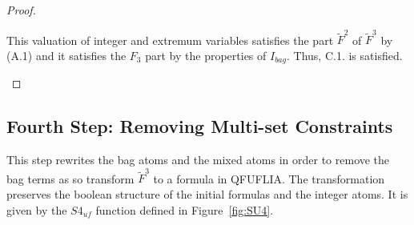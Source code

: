 \begin{proof}
\begin{enumerate}
This valuation of integer and extremum variables satisfies the part $\tilde{F}^2$ of $\tilde{F}^3$ by (A.1)
and it satisfies the $F_{3}$ part by the properties of $I_{bag}$.
Thus, C.1. is satisfied.
\end{enumerate}
\end{proof}

\subsection{Fourth Step: Removing Multi-set Constraints}
\label{subsec:rewritting qfuflia}
This step rewrites the bag atoms and the mixed atoms in order to remove the bag terms as so transform $\tilde{F}^3$ to a formula in QFUFLIA.
The transformation preserves the boolean structure of the initial formulas and the integer atoms.
It is given by the $S4_{\textit{uf}}$ function defined in Figure~\ref{fig:SU4}.

